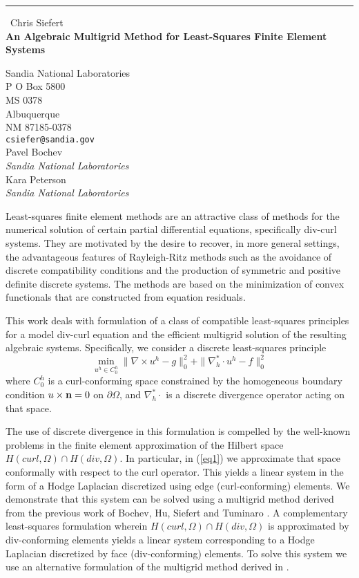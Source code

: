 \documentclass{report}
\begin{document}
\begin{center}
\rule{6in}{1pt} \
{\large Chris Siefert \\
{\bf An Algebraic Multigrid Method for Least-Squares Finite Element Systems}}

Sandia National Laboratories \\ P O Box 5800 \\ MS 0378 \\ Albuquerque \\ NM 87185-0378
\\
{\tt csiefer@sandia.gov}\\
Pavel Bochev\\
{\em Sandia National Laboratories}\\
Kara Peterson\\
{\em Sandia National Laboratories}\end{center}

Least-squares finite element methods are an attractive class of methods
for the numerical solution of certain partial differential equations,
specifically div-curl systems. They are motivated by the desire to
recover, in more general settings, the advantageous features of
Rayleigh-Ritz methods such as the avoidance of discrete compatibility
conditions and the production of symmetric and positive definite discrete
systems. The methods are based on the minimization of convex functionals
that are constructed from equation residuals.

This work deals with formulation of a class of compatible
least-squares principles for a model div-curl equation and the
efficient multigrid solution of the resulting algebraic
systems. Specifically, we consider a discrete least-squares principle
\begin{equation}\label{eq1}
\min_{u^h\in C^h_0}
\| \nabla \times u^h - g \|^2_0 + \| \nabla_h^* \cdot u^h - f\|^2_0
\end{equation}
where $C^h_0$ is a curl-conforming space constrained by the
homogeneous boundary condition $u\times {\bf n} = 0$ on
$\partial\Omega$, and $\nabla_h^* \cdot$ is a discrete divergence
operator acting on that space.

The use of discrete divergence in this formulation is compelled by the
well-known problems in the finite element approximation of the Hilbert
space $H(curl,\Omega)\cap H(div,\Omega)$. In particular, in
(\ref{eq1}) we approximate that space conformally with respect to the
curl operator. This yields a linear system in the form of a Hodge
Laplacian discretized using edge (curl-conforming) elements. We
demonstrate that this system can be solved using a multigrid method
derived from the previous work of Bochev, Hu, Siefert and Tuminaro
\cite{AMG:2007}. A complementary least-squares formulation wherein
$H(curl,\Omega)\cap H(div,\Omega)$ is approximated by div-conforming
elements yields a linear system corresponding to a Hodge Laplacian
discretized by face (div-conforming) elements. To solve this system we
use an alternative formulation of the multigrid method derived in
\cite{AMG:2008}.
\end{document}
